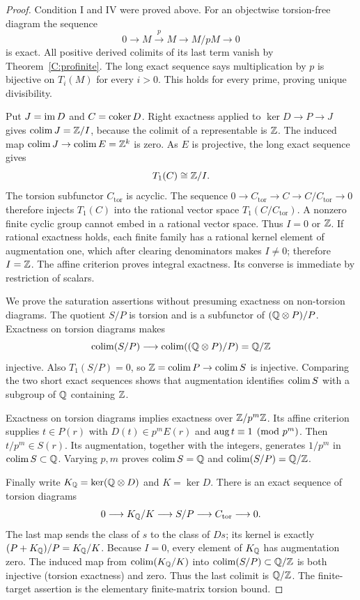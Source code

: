 \begin{proof}
Condition I and IV were proved above. For an objectwise torsion-free diagram the sequence
\[
 0\longrightarrow M\xrightarrow{p}M\longrightarrow M/pM\longrightarrow0
\]
is exact. All positive derived colimits of its last term vanish by Theorem~\ref{C:profinite}. The long exact sequence says multiplication by $p$ is bijective on $T_i(M)$ for every $i>0$. This holds for every prime, proving unique divisibility.

Put $J=\operatorname{im} D$ and $C=\operatorname{coker} D$. Right exactness applied to $\ker D\to P\to J$ gives $\operatorname*{colim} J=\mathbb Z/I$, because the colimit of a representable is $\mathbb Z$. The induced map $\operatorname*{colim} J\to\operatorname*{colim} E=\mathbb Z^k$ is zero. As $E$ is projective, the long exact sequence gives
\[
 T_1(C)\cong\mathbb Z/I.
\]
The torsion subfunctor $C_{\mathrm{tor}}$ is acyclic. The sequence $0\to C_{\mathrm{tor}}\to C\to C/C_{\mathrm{tor}}\to0$ therefore injects $T_1(C)$ into the rational vector space $T_1(C/C_{\mathrm{tor}})$. A nonzero finite cyclic group cannot embed in a rational vector space. Thus $I=0$ or $\mathbb Z$. If rational exactness holds, each finite family has a rational kernel element of augmentation one, which after clearing denominators makes $I\ne0$; therefore $I=\mathbb Z$. The affine criterion proves integral exactness. Its converse is immediate by restriction of scalars.

We prove the saturation assertions without presuming exactness on non-torsion diagrams. The quotient $S/P$ is torsion and is a subfunctor of $(\mathbb Q\otimes P)/P$. Exactness on torsion diagrams makes
\[
 \operatorname*{colim}(S/P)\longrightarrow\operatorname*{colim}((\mathbb Q\otimes P)/P)=\mathbb Q/\mathbb Z
\]
injective. Also $T_1(S/P)=0$, so $\mathbb Z=\operatorname*{colim} P\to\operatorname*{colim} S$ is injective. Comparing the two short exact sequences shows that augmentation identifies $\operatorname*{colim} S$ with a subgroup of $\mathbb Q$ containing $\mathbb Z$.

Exactness on torsion diagrams implies exactness over $\mathbb Z/p^m\mathbb Z$. Its affine criterion supplies $t\in P(r)$ with $D(t)\in p^mE(r)$ and $\operatorname{aug} t\equiv1\pmod {p^m}$. Then $t/p^m\in S(r)$. Its augmentation, together with the integers, generates $1/p^m$ in $\operatorname*{colim} S\subset\mathbb Q$. Varying $p,m$ proves $\operatorname*{colim} S=\mathbb Q$ and $\operatorname*{colim}(S/P)=\mathbb Q/\mathbb Z$.

Finally write $K_{\mathbb Q}=\ker(\mathbb Q\otimes D)$ and $K=\ker D$. There is an exact sequence of torsion diagrams
\[
 0\longrightarrow K_{\mathbb Q}/K\longrightarrow S/P
   \longrightarrow C_{\mathrm{tor}}\longrightarrow0.
\]
The last map sends the class of $s$ to the class of $Ds$; its kernel is exactly $(P+K_{\mathbb Q})/P=K_{\mathbb Q}/K$. Because $I=0$, every element of $K_{\mathbb Q}$ has augmentation zero. The induced map from $\operatorname*{colim}(K_{\mathbb Q}/K)$ into $\operatorname*{colim}(S/P)\subset\mathbb Q/\mathbb Z$ is both injective (torsion exactness) and zero. Thus the last colimit is $\mathbb Q/\mathbb Z$. The finite-target assertion is the elementary finite-matrix torsion bound.
\end{proof}

